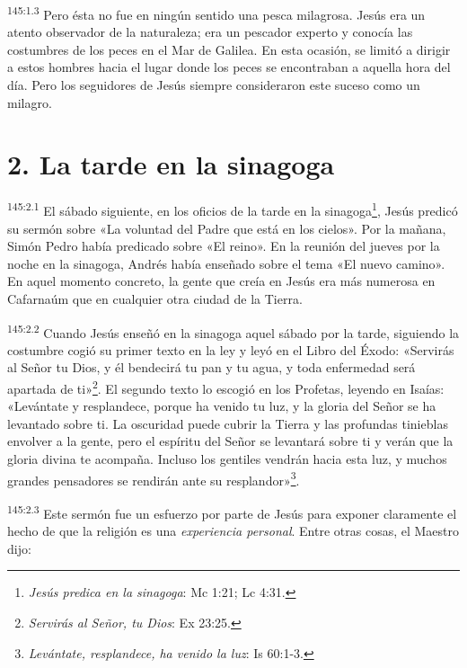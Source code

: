 \par
\textsuperscript{145:1.3} Pero ésta no fue en ningún sentido una pesca milagrosa. Jesús era un atento observador de la naturaleza; era un pescador experto y conocía las costumbres de los peces en el Mar de Galilea. En esta ocasión, se limitó a dirigir a estos hombres hacia el lugar donde los peces se encontraban a aquella hora del día. Pero los seguidores de Jesús siempre consideraron este suceso como un milagro.

\section*{2. La tarde en la sinagoga}
\par
\textsuperscript{145:2.1} El sábado siguiente, en los oficios de la tarde en la sinagoga\footnote{\textit{Jesús predica en la sinagoga}: Mc 1:21; Lc 4:31.}, Jesús predicó su sermón sobre «La voluntad del Padre que está en los cielos». Por la mañana, Simón Pedro había predicado sobre «El reino». En la reunión del jueves por la noche en la sinagoga, Andrés había enseñado sobre el tema «El nuevo camino». En aquel momento concreto, la gente que creía en Jesús era más numerosa en Cafarnaúm que en cualquier otra ciudad de la Tierra.

\par
\textsuperscript{145:2.2} Cuando Jesús enseñó en la sinagoga aquel sábado por la tarde, siguiendo la costumbre cogió su primer texto en la ley y leyó en el Libro del Éxodo: «Servirás al Señor tu Dios, y él bendecirá tu pan y tu agua, y toda enfermedad será apartada de ti»\footnote{\textit{Servirás al Señor, tu Dios}: Ex 23:25.}. El segundo texto lo escogió en los Profetas, leyendo en Isaías: «Levántate y resplandece, porque ha venido tu luz, y la gloria del Señor se ha levantado sobre ti. La oscuridad puede cubrir la Tierra y las profundas tinieblas envolver a la gente, pero el espíritu del Señor se levantará sobre ti y verán que la gloria divina te acompaña. Incluso los gentiles vendrán hacia esta luz, y muchos grandes pensadores se rendirán ante su resplandor»\footnote{\textit{Levántate, resplandece, ha venido la luz}: Is 60:1-3.}.

\par
\textsuperscript{145:2.3} Este sermón fue un esfuerzo por parte de Jesús para exponer claramente el hecho de que la religión es una \textit{experiencia personal}. Entre otras cosas, el Maestro dijo:


